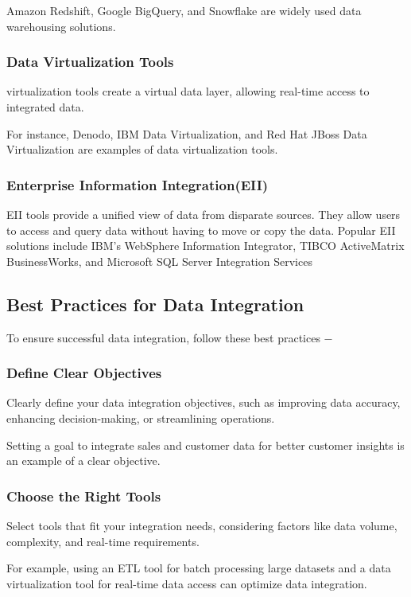 \documentclass[12pt]{book}
\begin{document}
Amazon Redshift, Google BigQuery, and Snowflake are widely used data warehousing solutions.

\subsubsection{Data Virtualization Tools}
virtualization tools create a virtual data layer, allowing real-time access to integrated data.

For instance, Denodo, IBM Data Virtualization, and Red Hat JBoss Data Virtualization are examples of data virtualization tools.

\subsubsection{Enterprise Information Integration(EII)}
EII tools provide a unified view of data from disparate sources. They allow users to access and query data without having to move or copy the data. Popular EII solutions include IBM’s WebSphere Information Integrator, TIBCO ActiveMatrix BusinessWorks, and Microsoft SQL Server Integration Services

\subsection{Best Practices for Data Integration}
To ensure successful data integration, follow these best practices −

\subsubsection{Define Clear Objectives}
Clearly define your data integration objectives, such as improving data accuracy, enhancing decision-making, or streamlining operations.

Setting a goal to integrate sales and customer data for better customer insights is an example of a clear objective.

\subsubsection{Choose the Right Tools}
Select tools that fit your integration needs, considering factors like data volume, complexity, and real-time requirements.

For example, using an ETL tool for batch processing large datasets and a data virtualization tool for real-time data access can optimize data integration.
\end{document}
